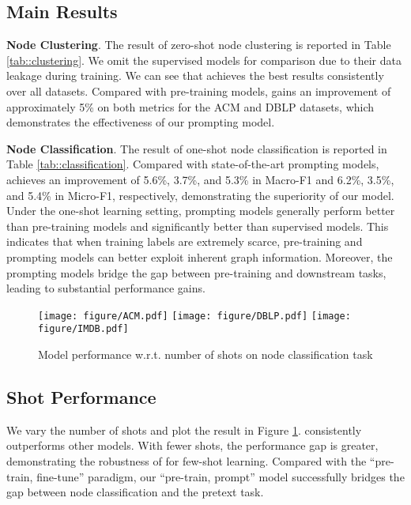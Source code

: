 \subsection{Main Results}

\noindent\textbf{Node Clustering}.
The result of zero-shot node clustering is reported in Table \ref{tab::clustering}. We omit the supervised models for comparison due to their data leakage during training. We can see that \ourmethod achieves the best results consistently over all datasets. Compared with pre-training models, \ourmethod gains an improvement of approximately 5\% on both metrics for the ACM and DBLP datasets, which demonstrates the effectiveness of our prompting model.

\noindent\textbf{Node Classification}.
The result of one-shot node classification is reported in Table \ref{tab::classification}. Compared with state-of-the-art prompting models, \ourmethod achieves an improvement of 5.6\%, 3.7\%, and 5.3\% in Macro-F1 and 6.2\%, 3.5\%, and 5.4\% in Micro-F1, respectively, demonstrating the superiority of our model. Under the one-shot learning setting, prompting models generally perform better than pre-training models and significantly better than supervised models. This indicates that when training labels are extremely scarce, pre-training and prompting models can better exploit inherent graph information. Moreover, the prompting models bridge the gap between pre-training and downstream tasks, leading to substantial performance gains.


\begin{figure}[t]
    \centering
    \texttt{[image: figure/ACM.pdf]}
    \texttt{[image: figure/DBLP.pdf]}
    \texttt{[image: figure/IMDB.pdf]}
    \caption{Model performance w.r.t. number of shots on node classification task}
    \label{fig::classification}
\end{figure}

\subsection{Shot Performance}
We vary the number of shots and plot the result in Figure \ref{fig::classification}. \ourmethod consistently outperforms other models. With fewer shots, the performance gap is greater, demonstrating the robustness of \ourmethod for few-shot learning. Compared with the ``pre-train, fine-tune'' paradigm, our ``pre-train, prompt'' model successfully bridges the gap between node classification and the pretext task.

